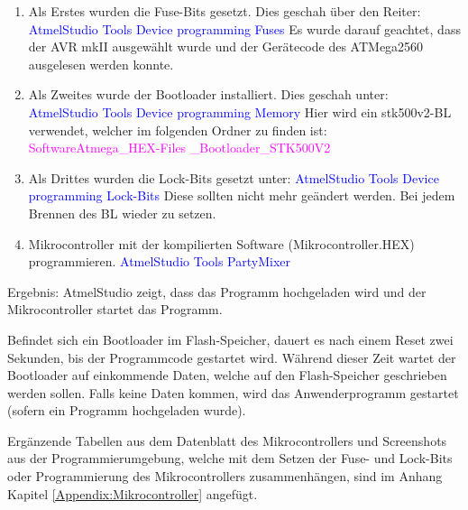 \begin{enumerate}
\item Als Erstes wurden die Fuse-Bits gesetzt. Dies geschah über den Reiter:\newline
\textcolor{blue}{AtmelStudio \textrightarrow Tools \textrightarrow Device programming \textrightarrow Fuses} \newline
Es wurde darauf geachtet, dass der AVR mkII ausgewählt wurde und der Gerätecode des ATMega2560 ausgelesen werden konnte.\newline

\item Als Zweites wurde der Bootloader installiert. Dies geschah unter:\newline
\textcolor{blue}{AtmelStudio \textrightarrow Tools \textrightarrow Device programming \textrightarrow Memory} \newline
Hier wird ein stk500v2-BL verwendet, welcher im folgenden Ordner zu finden ist:\newline
\textcolor{magenta}{Software\textrightarrow Atmega\_HEX-Files \_Bootloader\_STK500V2}\newline
\item Als Drittes wurden die Lock-Bits gesetzt unter:\newline
\textcolor{blue}{AtmelStudio \textrightarrow Tools \textrightarrow Device programming \textrightarrow Lock-Bits}\newline
Diese sollten nicht mehr geändert werden. Bei jedem Brennen des BL wieder zu setzen.\newline
\item Mikrocontroller mit der kompilierten Software (Mikrocontroller.HEX) programmieren.\newline
\textcolor{blue}{AtmelStudio \textrightarrow Tools \textrightarrow PartyMixer}\newline
\end{enumerate}

Ergebnis: AtmelStudio zeigt, dass das Programm hochgeladen wird und der Mikrocontroller startet das Programm.

Befindet sich ein Bootloader im Flash-Speicher, dauert es nach einem Reset zwei Sekunden, bis der Programmcode gestartet wird. Während dieser Zeit wartet der Bootloader auf einkommende Daten, welche auf den Flash-Speicher geschrieben werden sollen. Falls keine Daten kommen, wird das Anwenderprogramm gestartet (sofern ein Programm hochgeladen wurde).

Ergänzende Tabellen aus dem Datenblatt des Mikrocontrollers und Screenshots aus der Programmierumgebung, welche mit dem Setzen der Fuse- und Lock-Bits oder Programmierung des Mikrocontrollers zusammenhängen, sind im Anhang Kapitel \ref{Appendix:Mikrocontroller} angefügt.